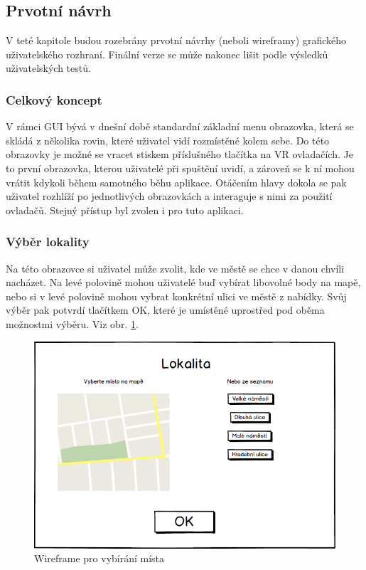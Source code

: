 \documentclass[thesis=B,czech]{FITthesis}[2012/06/26]
\begin{document}
	\subsection{Prvotní návrh}
V teté kapitole budou rozebrány prvotní návrhy (neboli wireframy) grafického uživatelského rozhraní. Finální verze se může nakonec lišit podle výsledků uživatelských testů.

	\subsubsection{Celkový koncept}
V rámci GUI bývá v dnešní době standardní základní menu obrazovka, která se skládá z několika rovin, které uživatel vidí rozmístěné kolem sebe. Do této obrazovky je možné se vracet stiskem příslušného tlačítka na VR ovladačích. Je to první obrazovka, kterou uživatelé při spuštění uvidí, a zároveň se k ní mohou vrátit kdykoli během samotného běhu aplikace. Otáčením hlavy dokola se pak uživatel rozhlíží po jednotlivých obrazovkách a interaguje s nimi za použití ovladačů. Stejný přístup byl zvolen i pro tuto aplikaci. 

	\subsubsection{Výběr lokality}
Na této obrazovce si uživatel může zvolit, kde ve městě se chce v danou chvíli nacházet. Na levé polovině mohou uživatelé buď vybírat libovolné body na mapě, nebo si v levé polovině mohou vybrat konkrétní ulici ve městě z nabídky.  Svůj výběr pak potvrdí tlačítkem OK, které je umístěné uprostřed pod oběma možnostmi výběru. Viz obr. \ref{fig:mockMisto}.

	\begin{figure}
  		\includegraphics[width=\textwidth,height=\textheight,keepaspectratio]{MockMisto.png}
  		\caption{Wireframe pro vybírání místa}
  		\label{fig:mockMisto}
	\end{figure}
	
\end{document}
